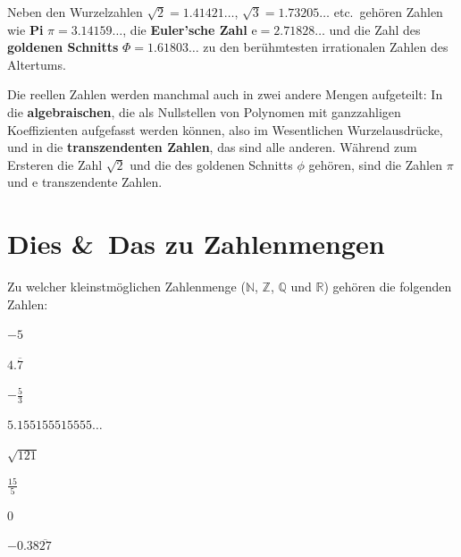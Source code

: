\documentclass[%
11pt,%
twoside,%
titlepage,%
german,%
headsepline%
]{scrartcl}
\begin{document}
Neben den Wurzelzahlen $\sqrt{2}=1.41421\dots$, $\sqrt{3}=1.73205\dots$ etc.\ gehören Zahlen wie \textbf{Pi} $\pi=3.14159\dots$, die \textbf{Euler'sche Zahl} $\mathrm{e}=2.71828\dots$ und die Zahl des \textbf{goldenen Schnitts} $\Phi=1.61803\dots$
zu den berühmtesten irrationalen Zahlen des Altertums.

\begin{bem}
Die reellen Zahlen werden manchmal auch in zwei andere Mengen
aufgeteilt: In die \textbf{algebraischen}, die als Nullstellen von
Polynomen mit ganzzahligen Koeffizienten aufgefasst werden können, also im Wesentlichen Wurzelausdrücke, und in die
\textbf{transzendenten Zahlen}, das sind alle anderen. Während zum Ersteren die Zahl $\sqrt{2}$ und die des goldenen Schnitts $\phi$ gehören, sind die Zahlen $\pi$ und $\mathrm{e}$ transzendente Zahlen.
\end{bem}

\clearpage

\section{Dies \&\ Das zu Zahlenmengen}

\begin{ueb}[Klassifizieren]
Zu welcher kleinstmöglichen Zahlenmenge ($\mathbb{N}$, $\mathbb{Z}$, $\mathbb{Q}$ und $\mathbb{R}$) gehören die folgenden Zahlen:

\begin{minipage}{0.45\textwidth}
\begin{enumeratea}
\item $-5$
\item $4.\overline{7}$
\item $-\frac{5}{3}$
\item $5.155155515555\dots$
\end{enumeratea}
\end{minipage}
\begin{minipage}{0.4\textwidth}
\begin{enumeratea}
\setcounter{enumi}{4}
\item $\sqrt{121}$
\item $\frac{15}{5}$
\item $0$
\item $-0.38\overline{27}$
\end{enumeratea}
\end{minipage}
\end{ueb}
	
\end{document}
